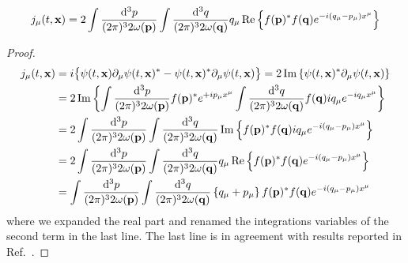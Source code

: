 \begin{lemma}
	\begin{equation}
		j_\mu(t,\vb{x})
		=
		2
		\int\frac{\dd[3]{p}}{(2\pi)^32\omega(\vb{p})}
		\int\frac{\dd[3]{q}}{(2\pi)^32\omega(\vb{q})}
		q_\mu
		\operatorname{\operatorname{Re}}\left\{
			f(\vb{p})^*
			f(\vb{q})
			e^{-i(q_\mu-p_\mu)x^\mu}
		\right\}
	\end{equation}
\end{lemma}
\begin{proof}
	\begin{equation}
		\begin{split}
			j_\mu(t,\vb{x})
			&=
			i
			\bigl\{
				\psi(t,\vb{x})
				\partial_\mu
				\psi(t,\vb{x})^*
				-
				\psi(t,\vb{x})^*
				\partial_\mu
				\psi(t,\vb{x})
			\bigr\}
			=
			2
			\operatorname{\operatorname{Im}}\left\{
				\psi(t,\vb{x})^*
				\partial_\mu
				\psi(t,\vb{x})
			\right\}
			\\
			&=
			2
			\operatorname{\operatorname{Im}}\left\{
				\int\frac{\dd[3]{p}}{(2\pi)^32\omega(\vb{p})}
				f(\vb{p})^*e^{+ip_\mu x^\mu}
				\int\frac{\dd[3]{q}}{(2\pi)^32\omega(\vb{q})}
				f(\vb{q})iq_\mu e^{-iq_\mu x^\mu}
			\right\}
			\\
			&=
			2
			\int\frac{\dd[3]{p}}{(2\pi)^32\omega(\vb{p})}
			\int\frac{\dd[3]{q}}{(2\pi)^32\omega(\vb{q})}
			\operatorname{\operatorname{Im}}\left\{
				f(\vb{p})^*
				f(\vb{q})
				iq_\mu
				e^{-i(q_\mu-p_\mu)x^\mu}
			\right\}
			\\
			&=
			2
			\int\frac{\dd[3]{p}}{(2\pi)^32\omega(\vb{p})}
			\int\frac{\dd[3]{q}}{(2\pi)^32\omega(\vb{q})}
			q_\mu
			\operatorname{\operatorname{Re}}\left\{
				f(\vb{p})^*
				f(\vb{q})
				e^{-i(q_\mu-p_\mu)x^\mu}
			\right\}
			\\
			&=
			\int\frac{\dd[3]{p}}{(2\pi)^32\omega(\vb{p})}
			\int\frac{\dd[3]{q}}{(2\pi)^32\omega(\vb{q})}
			\left\{
				q_\mu
				+
				p_\mu
			\right\}
			f(\vb{p})^*
			f(\vb{q})
			e^{-i(q_\mu-p_\mu)x^\mu}
		\end{split}
	\end{equation}
	where we expanded the real part and renamed the integrations variables of the second term in the last line.
	The last line is in agreement with results reported in Ref.~\cite{Naumov2013}.
\end{proof}

